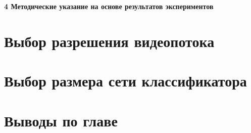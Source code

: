 \newpage
\begin{center}
  \textbf{\large 4 Методические указание на основе результатов экспериментов}
\end{center}

\section{Выбор разрешения видеопотока}

\section{Выбор размера сети классификатора}


\section{Выводы по главе}
